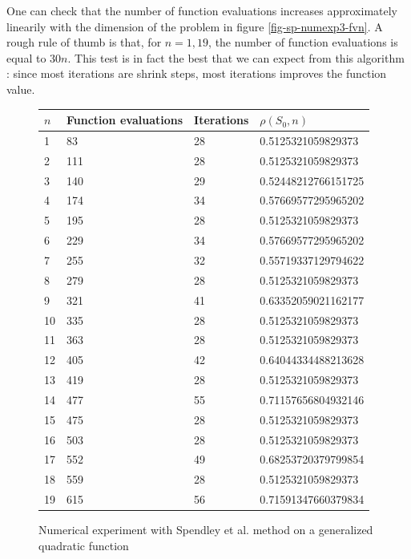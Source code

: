 One can check that the number of function evaluations 
increases approximately linearily with the dimension of the problem in
figure \ref{fig-sp-numexp3-fvn}. A rough rule of thumb is that, for $n=1,19$, 
the number of function evaluations is equal to $30n$.
This test is in fact the best that we can expect from this algorithm : since 
most iterations are shrink steps, most iterations improves the function value.

\begin{figure}[htbp]
\begin{center}
\begin{tiny}
\begin{tabular}{|l|l|l|l|}
\hline
$n$ & Function evaluations & Iterations & $\rho(S_0,n)$\\
\hline
1 & 83 & 28 & 0.5125321059829373\\
2 & 111 & 28 & 0.5125321059829373\\
3 & 140 & 29 & 0.52448212766151725\\
4 & 174 & 34 & 0.57669577295965202\\
5 & 195 & 28 & 0.5125321059829373\\
6 & 229 & 34 & 0.57669577295965202\\
7 & 255 & 32 & 0.55719337129794622\\
8 & 279 & 28 & 0.5125321059829373\\
9 & 321 & 41 & 0.63352059021162177\\
10 & 335 & 28 & 0.5125321059829373\\
11 & 363 & 28 & 0.5125321059829373\\
12 & 405 & 42 & 0.64044334488213628\\
13 & 419 & 28 & 0.5125321059829373\\
14 & 477 & 55 & 0.71157656804932146\\
15 & 475 & 28 & 0.5125321059829373\\
16 & 503 & 28 & 0.5125321059829373\\
17 & 552 & 49 & 0.68253720379799854\\
18 & 559 & 28 & 0.5125321059829373\\
19 & 615 & 56 & 0.71591347660379834\\
\hline
\end{tabular}
\end{tiny}
\end{center}
\caption{Numerical experiment with Spendley et al. method on a generalized quadratic function}
\label{fig-sp-numexp3-dimension}
\end{figure}

